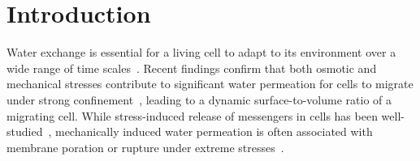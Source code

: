 \documentclass[prb,preprint,showpacs,preprintnumbers,amsmath,amssymb,longbibliography]{revtex4-1}
\begin{document}
\section{Introduction\label{s:introduction}}
Water exchange is essential for a living cell to adapt to its
environment over a wide range of time
scales~\cite{CadartVenkovaRechoEtAl2019_NaturePhys,
AlbertsMolecularBiology, YangMaVerkman2001_JBC,
SugieIntaglietta2018_AmJPhysiolHCP,
SaadounPapadopoulosWatanabeEtAl2005_JCS, Verkman2008_JMM,
BerthaudEtAl2016_SM, Keren2011_EurBJ, TaloniKardashSalmanEtAl2015_PRL}.  
%
Recent findings confirm that both osmotic and mechanical stresses
contribute to significant water permeation for cells to migrate under
strong confinement~\cite{JiangSun2013_BJ, StrokaJiangChenEtAl2014_Cell,
LiMoriSun2015_PRL, yao-mor2017}, leading to a dynamic surface-to-volume
ratio of a migrating cell. While stress-induced release of messengers in
cells has been well-studied~\cite{Wan2008_PNAS, ForsythWan2011_PNAS, 
Russell-PuleriPazAdams2016_AJHCP, ZhangShenHoganBarakatMisbah2018_BJ,
GordonShimmelFrye2020_FP},
mechanically induced water permeation is often associated with membrane
poration or rupture under extreme
stresses~\cite{HarmanBertrandJoos2017_CJP,
RazizadehNikfarPaulLiu2020_BJ}. 
\end{document}
